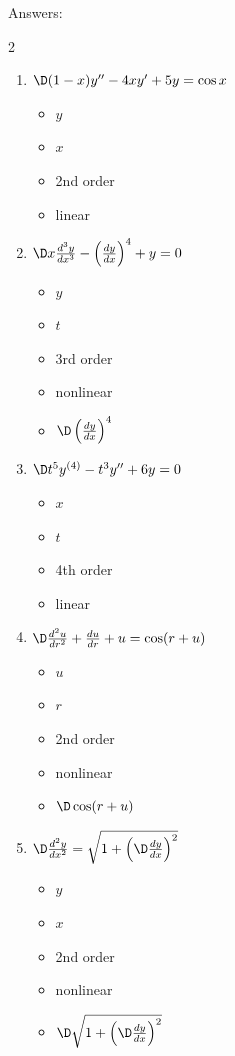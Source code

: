\documentclass[12pt]{amsart}
\numberwithin{equation}{section}
\begin{document}
\newpage
\noindent  Answers:
\begin{multicols}{2}
\begin{enumerate}[1.]
\item  $\D (1 - x)y'' - 4xy' + 5y = \cos x$
	\begin{itemize}
	\item $y$
	\item $x$
	\item 2nd order
	\item linear
	\end{itemize}

\vspace{1.1cm}

\item  $\D x \frac{d^3y}{dx^3} - \left( \frac{dy}{dx} \right)^4 + y = 0$
	\begin{itemize}
	\item $y$
	\item $t$
	\item 3rd order
	\item nonlinear
	\item $\D \left( \frac{dy}{dx} \right)^4$
	\end{itemize}

\vspace{1.1cm}

\item  $\D t^5 y^{(4)} - t^3 y'' + 6y = 0$
	\begin{itemize}
	\item $x$
	\item $t$
	\item 4th order
	\item linear
	\end{itemize}

\vspace{1.1cm}

\item  $\D \frac{d^2u}{dr^2} + \frac{du}{dr} + u = \cos(r+u) $
	\begin{itemize}
	\item $u$
	\item $r$
	\item 2nd order
	\item nonlinear
	\item $\D \cos(r+u)$
	\end{itemize}

\vspace{1.1cm}

\item  $\D \frac{d^2y}{dx^2} = \sqrt{1 + \left(\D \frac{dy}{dx}  \right)^2} $
	\begin{itemize}
	\item $y$
	\item $x$
	\item 2nd order
	\item nonlinear
	\item $\D \sqrt{1 + \left(\D \frac{dy}{dx}  \right)^2}$
	\end{itemize}


\end{enumerate}
\end{multicols}
\end{document}
